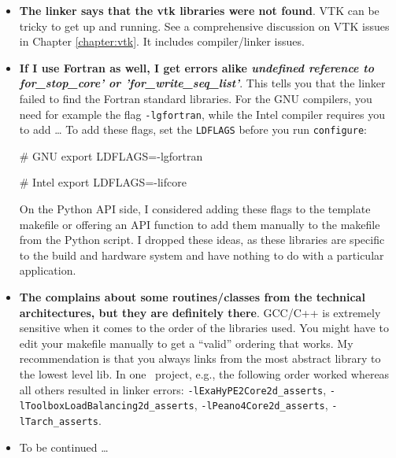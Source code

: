 \begin{itemize}
  \item \textbf{The linker says that the vtk libraries were not found}.
  VTK can be tricky to get up and running. See a comprehensive discussion on VTK
  issues in Chapter \ref{chapter:vtk}. It includes compiler/linker issues.
  \item \textbf{If I use Fortran as well, I get errors alike \emph{undefined
  reference to for\_stop\_core' or 'for\_write\_seq\_list'}}. This tells you
  that the linker failed to find the Fortran standard libraries. For the GNU
  compilers, you need for example the flag \texttt{-lgfortran}, while the Intel
  compiler requires you to add \ldots
  To add these flags, set the \texttt{LDFLAGS} before you run
  \texttt{configure}:
  \begin{code}
# GNU
export LDFLAGS=-lgfortran

# Intel
export LDFLAGS=-lifcore
  \end{code}
  On the Python API side, I considered adding these flags to the template
  makefile or offering an API function to add them manually to the makefile from
  the Python script. I dropped these ideas, as these libraries are specific to
  the build and hardware system and have nothing to do with a particular
  application.
  \item \textbf{The complains about some routines/classes from the technical
  architectures, but they are definitely there}.
  GCC/C++ is extremely sensitive when it comes to the order of the libraries
  used. You might have to edit your makefile manually to get a ``valid''
  ordering that works. My recommendation is that you always links from the most
  abstract library to the lowest level lib. In one \ExaHyPE\ project, e.g., the
  following order worked whereas all others resulted in linker errors:
  \texttt{-lExaHyPE2Core2d\_asserts},
  \texttt{-lToolboxLoadBalancing2d\_asserts}, \texttt{-lPeano4Core2d\_asserts},
  \texttt{-lTarch\_asserts}.
  \item To be continued \dots
\end{itemize}




